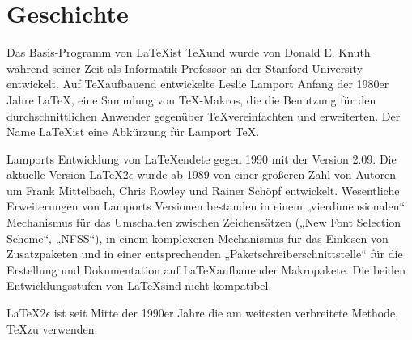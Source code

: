 
\chapter{Geschichte}

Das Basis-Programm von \LaTeX ist \TeX und wurde von Donald E. Knuth während seiner Zeit als Informatik-Professor an der Stanford University entwickelt. Auf \TeX aufbauend entwickelte Leslie Lamport Anfang der 1980er Jahre\cite{Lamport} \LaTeX, eine Sammlung von TeX-Makros, die die Benutzung für den durchschnittlichen Anwender gegenüber \TeX vereinfachten und erweiterten. Der Name \LaTeX ist eine Abkürzung für Lamport \TeX.

Lamports Entwicklung von \LaTeX endete gegen 1990 mit der Version 2.09.\cite{readme} Die aktuelle Version \LaTeX 2$\epsilon$ wurde ab 1989 von einer größeren Zahl von Autoren um Frank Mittelbach, Chris Rowley und Rainer Schöpf entwickelt.\cite{Mittelbach2010} Wesentliche Erweiterungen von Lamports Versionen bestanden in einem „vierdimensionalen“ Mechanismus für das Umschalten zwischen Zeichensätzen („New Font Selection Scheme“, „NFSS“), in einem komplexeren Mechanismus für das Einlesen von Zusatzpaketen und in einer entsprechenden „Paketschreiberschnittstelle“ für die Erstellung und Dokumentation auf \LaTeX aufbauender Makropakete.\cite{usrguide} Die beiden Entwicklungsstufen von \LaTeX sind nicht kompatibel.

\LaTeX 2$\epsilon$ ist seit Mitte der 1990er Jahre die am weitesten verbreitete Methode, \TeX zu verwenden.